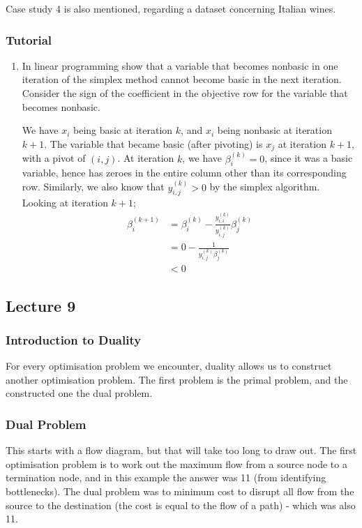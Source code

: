 \documentclass[a4paper, 12pt]{article}
\begin{document}
                Case study 4 is also mentioned, regarding a dataset concerning Italian wines.
            \subsubsection*{Tutorial}
                \begin{enumerate}[1.]
                    \item
                        In linear programming show that a variable that becomes nonbasic in one iteration of the simplex method cannot become basic in the next iteration.
                        Consider the sign of the coefficient in the objective row for the variable that becomes nonbasic.
                        \smallskip

                        We have $x_i$ being basic at iteration $k$, and $x_i$ being nonbasic at iteration $k + 1$.
                        The variable that became basic (after pivoting) is $x_j$ at iteration $k + 1$, with a pivot of $(i, j)$.
                        At iteration $k$, we have $\beta^{(k)}_i = 0$, since it was a basic variable, hence has zeroes in the entire column other than its corresponding row.
                        Similarly, we also know that $y^{(k)}_{i, j} > 0$ by the simplex algorithm.
                        Looking at iteration $k + 1$;
                        \begin{align*}
                            \beta^{(k + 1)}_i & = \beta^{(k)}_i - \frac{y^{(k)}_{i, i}}{y^{(k)}_{i, j}}\beta^{(k)}_j \\
                            & = 0 - \frac{1}{y^{(k)}_{i, j}\beta^{(k)}_j} \\
                            & < 0
                        \end{align*}
                \end{enumerate}
        \subsection*{Lecture 9}
            \subsubsection*{Introduction to Duality}
                For every optimisation problem we encounter, duality allows us to construct another optimisation problem.
                The first problem is the primal problem, and the constructed one the dual problem.
            \subsubsection*{Dual Problem}
                This starts with a flow diagram, but that will take too long to draw out.
                The first optimisation problem is to work out the maximum flow from a source node to a termination node, and in this example the answer was 11 (from identifying bottlenecks).
                The dual problem was to minimum cost to disrupt all flow from the source to the destination (the cost is equal to the flow of a path) - which was also 11.
                \medskip
\end{document}
